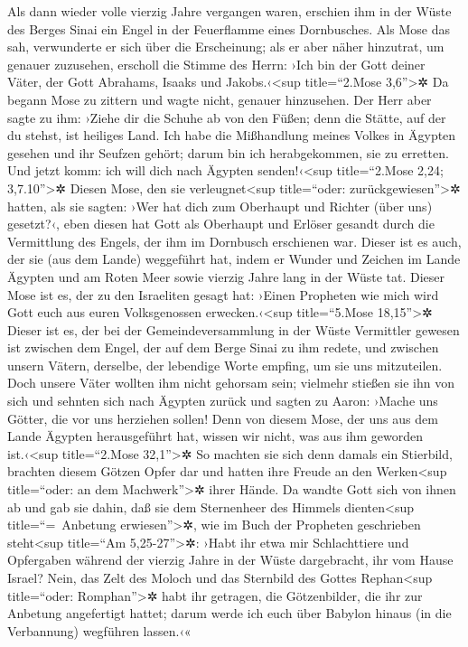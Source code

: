  Als dann wieder volle vierzig Jahre vergangen waren,
erschien ihm in der Wüste des Berges Sinai ein Engel in der Feuerflamme
eines Dornbusches.  Als Mose das sah, verwunderte er sich
über die Erscheinung; als er aber näher hinzutrat, um genauer zuzusehen,
erscholl die Stimme des Herrn:  ›Ich bin der Gott deiner
Väter, der Gott Abrahams, Isaaks und Jakobs.‹\textless sup
title=``2.Mose 3,6''\textgreater✲ Da begann Mose zu zittern und wagte
nicht, genauer hinzusehen.  Der Herr aber sagte zu ihm:
›Ziehe dir die Schuhe ab von den Füßen; denn die Stätte, auf der du
stehst, ist heiliges Land.  Ich habe die Mißhandlung
meines Volkes in Ägypten gesehen und ihr Seufzen gehört; darum bin ich
herabgekommen, sie zu erretten. Und jetzt komm: ich will dich nach
Ägypten senden!‹\textless sup title=``2.Mose 2,24; 3,7.10''\textgreater✲
 Diesen Mose, den sie verleugnet\textless sup
title=``oder: zurückgewiesen''\textgreater✲ hatten, als sie sagten: ›Wer
hat dich zum Oberhaupt und Richter (über uns) gesetzt?‹, eben diesen hat
Gott als Oberhaupt und Erlöser gesandt durch die Vermittlung des Engels,
der ihm im Dornbusch erschienen war.  Dieser ist es auch,
der sie (aus dem Lande) weggeführt hat, indem er Wunder und Zeichen im
Lande Ägypten und am Roten Meer sowie vierzig Jahre lang in der Wüste
tat.  Dieser Mose ist es, der zu den Israeliten gesagt
hat: ›Einen Propheten wie mich wird Gott euch aus euren Volksgenossen
erwecken.‹\textless sup title=``5.Mose 18,15''\textgreater✲
 Dieser ist es, der bei der Gemeindeversammlung in der
Wüste Vermittler gewesen ist zwischen dem Engel, der auf dem Berge Sinai
zu ihm redete, und zwischen unsern Vätern, derselbe, der lebendige Worte
empfing, um sie uns mitzuteilen.  Doch unsere Väter
wollten ihm nicht gehorsam sein; vielmehr stießen sie ihn von sich und
sehnten sich nach Ägypten zurück  und sagten zu Aaron:
›Mache uns Götter, die vor uns herziehen sollen! Denn von diesem Mose,
der uns aus dem Lande Ägypten herausgeführt hat, wissen wir nicht, was
aus ihm geworden ist.‹\textless sup title=``2.Mose 32,1''\textgreater✲
 So machten sie sich denn damals ein Stierbild, brachten
diesem Götzen Opfer dar und hatten ihre Freude an den
Werken\textless sup title=``oder: an dem Machwerk''\textgreater✲ ihrer
Hände.  Da wandte Gott sich von ihnen ab und gab sie
dahin, daß sie dem Sternenheer des Himmels dienten\textless sup
title=``=~Anbetung erwiesen''\textgreater✲, wie im Buch der Propheten
geschrieben steht\textless sup title=``Am 5,25-27''\textgreater✲: ›Habt
ihr etwa mir Schlachttiere und Opfergaben während der vierzig Jahre in
der Wüste dargebracht, ihr vom Hause Israel?  Nein, das
Zelt des Moloch und das Sternbild des Gottes Rephan\textless sup
title=``oder: Romphan''\textgreater✲ habt ihr getragen, die
Götzenbilder, die ihr zur Anbetung angefertigt hattet; darum werde ich
euch über Babylon hinaus (in die Verbannung) wegführen lassen.‹«

